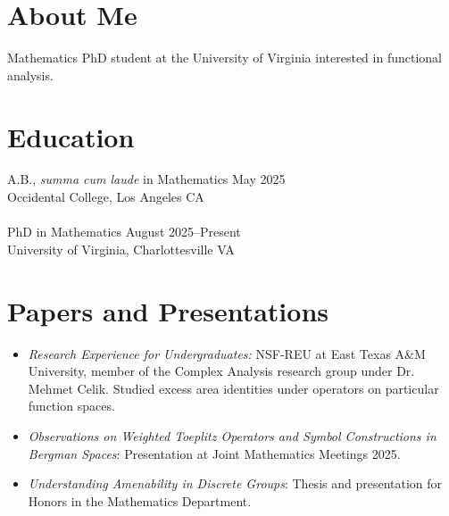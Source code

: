 \documentclass[margin, 12pt]{res} %
\begin{document}
\begin{resume}

\section{\sc About Me}
Mathematics PhD student at the University of Virginia interested in functional analysis.

\section{\sc Education}

A.B., \textsl{summa cum laude} in Mathematics \hfill May 2025 \\
Occidental College, Los Angeles CA\\
\vspace{6pt}\\
PhD in Mathematics \hfill August 2025--Present\\
University of Virginia, Charlottesville VA
\section{\sc Papers and Presentations}
\begin{itemize}
  \item {\sl Research Experience for Undergraduates:} NSF-REU at East Texas A\&M University, member of the Complex Analysis research group under Dr. Mehmet Celik. Studied excess area identities under operators on particular function spaces.
  \item {\sl Observations on Weighted Toeplitz Operators and Symbol Constructions in Bergman Spaces}: Presentation at Joint Mathematics Meetings 2025.
  \item {\sl Understanding Amenability in Discrete Groups}: Thesis and presentation for Honors in the Mathematics Department.
\end{itemize}

\end{resume}
\end{document}

